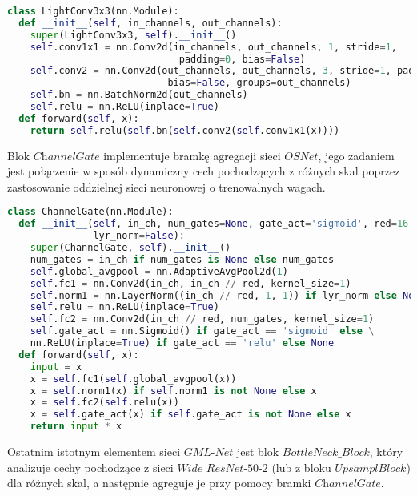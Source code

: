 \vspace{1cm}

\cell
\begin{lstlisting}[name=Rozdzial3.1, language=Python]
class LightConv3x3(nn.Module):
  def __init__(self, in_channels, out_channels):
    super(LightConv3x3, self).__init__()
    self.conv1x1 = nn.Conv2d(in_channels, out_channels, 1, stride=1, 
                              padding=0, bias=False)
    self.conv2 = nn.Conv2d(out_channels, out_channels, 3, stride=1, padding=1,
                            bias=False, groups=out_channels)
    self.bn = nn.BatchNorm2d(out_channels)
    self.relu = nn.ReLU(inplace=True)
  def forward(self, x):
    return self.relu(self.bn(self.conv2(self.conv1x1(x))))
\end{lstlisting}


\cell
Blok $\textit{ChannelGate}$ implementuje bramkę agregacji sieci $\textit{OSNet}$, jego zadaniem jest połączenie w sposób dynamiczny cech pochodzących z różnych skal poprzez zastosowanie oddzielnej sieci neuronowej o trenowalnych wagach.

\cell
\begin{lstlisting}[name=Rozdzial3.1, language=Python]
class ChannelGate(nn.Module):
  def __init__(self, in_ch, num_gates=None, gate_act='sigmoid', red=16, 
               lyr_norm=False):
    super(ChannelGate, self).__init__()
    num_gates = in_ch if num_gates is None else num_gates
    self.global_avgpool = nn.AdaptiveAvgPool2d(1)
    self.fc1 = nn.Conv2d(in_ch, in_ch // red, kernel_size=1)
    self.norm1 = nn.LayerNorm((in_ch // red, 1, 1)) if lyr_norm else None
    self.relu = nn.ReLU(inplace=True)
    self.fc2 = nn.Conv2d(in_ch // red, num_gates, kernel_size=1)
    self.gate_act = nn.Sigmoid() if gate_act == 'sigmoid' else \
    nn.ReLU(inplace=True) if gate_act == 'relu' else None 
  def forward(self, x):
    input = x
    x = self.fc1(self.global_avgpool(x))
    x = self.norm1(x) if self.norm1 is not None else x
    x = self.fc2(self.relu(x))
    x = self.gate_act(x) if self.gate_act is not None else x
    return input * x
\end{lstlisting}


\cell
Ostatnim istotnym elementem sieci $\textit{GML-Net}$ jest blok $\textit{BottleNeck$\_$Block}$, który analizuje cechy pochodzące z sieci $\textit{Wide ResNet-50-2}$ (lub z bloku  $\textit{UpsamplBlock}$) dla różnych skal, a następnie agreguje je przy pomocy bramki $\textit{ChannelGate}$.

